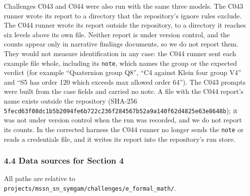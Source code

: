 \documentclass[
  11pt,
]{article}
\newcommand{\passthrough}[1]{#1}
\begin{document}
Challenges C043 and C044 were also run with the same three models. The
C043 runner wrote its report to a directory that the repository's ignore
rules exclude. The C044 runner wrote its report outside the repository,
to a directory it reaches six levels above its own file. Neither report
is under version control, and the counts appear only in narrative
findings documents, so we do not report them. They would not measure
identification in any case: the C044 runner sent each example file
whole, including its \passthrough{\lstinline!note!}, which names the
group or the expected verdict (for example ``Quaternion group Q8'', ``C4
against Klein four group V4'' and ``S5 has order 120 which exceeds max
allowed order 64''). The C043 prompts were built from the case fields
and carried no note. A file with the C044 report's name exists outside
the repository (SHA-256
\nolinkurl{5fecd63f08dc1b5b2094fe6b722c236f284567b52a9a140f62d4825e63e8648b});
it was not under version control when the run was recorded, and we do
not report its counts. In the corrected harness the C044 runner no
longer sends the \passthrough{\lstinline!note!} or reads a credentials
file, and it writes its report into the repository's run store.

\subsubsection{4.4 Data sources for Section
4}\label{data-sources-for-section-4}

All paths are relative to
\nolinkurl{projects/mssn_sn_symgam/challenges/e_formal_math/}.
\end{document}
